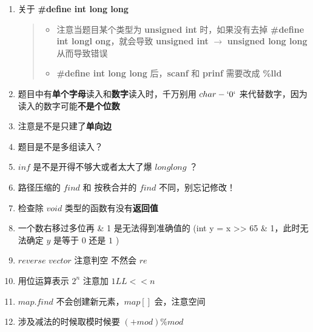 \documentclass[E:/GsjzTle/main/main.tex]{subfiles}
\begin{document}
\begin{enumerate}
\def\labelenumi{\arabic{enumi}.}
\item
  关于 \textbf{\#define int long long}

  \begin{quote}
  \begin{itemize}
  \item
    注意当题目某个类型为 \textbf{unsigned int} 时，如果没有去掉
    \textbf{\#define int longl ong}，就会导致 \textbf{unsigned int}
    \(→\) \textbf{unsigned long long} 从而导致错误
  \item
    \textbf{\#define int long long} 后，\textbf{scanf} 和 \textbf{prinf}
    需要改成 \textbf{\%lld}
  \end{itemize}
  \end{quote}
\item
  题目中有\textbf{单个字母}读入和\textbf{数字}读入时，千万别用
  \(char - `0`\) 来代替数字，因为读入的数字可能\textbf{不是个位数}
\item
  注意是不是只建了\textbf{单向边}
\item
  题目是不是多组读入？
\item
  \(inf\) 是不是开得不够大或者太大了爆 \(long long\) ？
\item
  路径压缩的 \(find\) 和 按秩合并的 \(find\) 不同，别忘记修改！
\item
  检查除 \(void\) 类型的函数有没有\textbf{返回值}
\item
  一个数右移过多位再 \& 1 是无法得到准确值的 (int y = x
  \textgreater\textgreater{} 65 \& 1，此时无法确定 \(y\) 是等于 \(0\)
  还是 \(1\) )
\item
  \(reverse\) \(vector\) 注意判空 不然会 \(re\)
\item
  用位运算表示 \(2^n\) 注意加 \(1LL<<n\)
\item
  \(map.find\) 不会创建新元素，\(map[]\) 会，注意空间
\item
  涉及减法的时候取模时候要 \((+mod)\% mod\)
\end{enumerate}
\end{document}
